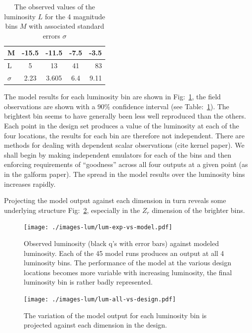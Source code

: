 \documentclass[11pt]{article}
\begin{document}
\begin{table}
  \begin{center}
    \begin{tabular}{l c c c r}
      M & -15.5 & -11.5 & -7.5 & -3.5 \\
      \hline
      L & 5 & 13 & 41 & 83 \\
      $\sigma$ & 2.23 & 3.605 & 6.4 & 9.11
    \end{tabular}
    \caption{ The observed values of the luminosity $L$ for the 4 magnitude bins $M$ with associated standard errors $\sigma$}
    \label{tab-lum-obs}
  \end{center}
\end{table}


The model results for each luminosity bin are shown in Fig:~\ref{fig-lum-vs-exp}, the field observations are shown with a $90\%$ confidence interval (see Table:~\ref{tab-lum-obs}). The brightest bin seems to have generally been less well reproduced than the others. Each point in the design set produces a value of the luminosity at each of the four locations, the results for each bin are therefore not independent. There are methods for dealing with dependent scalar observations  (cite kernel paper). We shall begin by making independent emulators for each of the bins and then enforcing requirements of ``goodness'' across all four outputs at a given point (as in the galform paper). The spread in the model results over the luminosity bins increases rapidly.

Projecting the model output against each dimension in turn reveals some underlying structure Fig:~\ref{fig-lum-vs-design}, especially in the $Z_r$ dimension of the brighter bins. 

\begin{figure}
  \begin{center}
    \texttt{[image: ./images-lum/lum-exp-vs-model.pdf]}
    \caption{Observed luminosity (black q's with error bars) against modeled luminosity. Each of the 45 model runs produces an output at all 4 luminosity bins. The performance of the model at the various design locations becomes more variable with increasing luminosity, the final luminosity bin is rather badly represented.}
    \label{fig-lum-vs-exp}
  \end{center}
\end{figure}

\begin{landscape}
  \begin{figure}
    \begin{center}
      \texttt{[image: ./images-lum/lum-all-vs-design.pdf]}
      \caption{The variation of the model output for each luminosity bin is projected against each dimension in the design. }
      \label{fig-lum-vs-design}
    \end{center}
  \end{figure}
\end{landscape}
\end{document}
